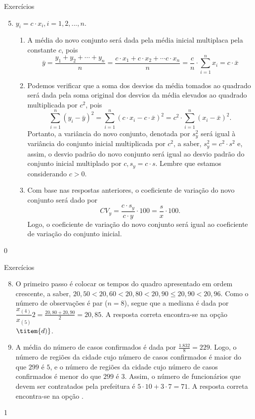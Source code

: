 \begin{answer}{Exercícios}
{\exerciselist
  \begin{enumerate}\setcounter{enumi}{4}
  \item $y_i=c\cdot x_i,i=1,2,...,n.$
  \begin{enumerate}
  \item A média do novo conjunto será dada pela média inicial multiplaca pela constante $c$, pois 
  \begin{equation*}
  \bar{y}=\frac{y_1+y_2+\cdots+y_n}{n}=\frac{c\cdot x_1+c\cdot x_2+\cdots c\cdot x_n}{n}=\frac{c}{n}\cdot\sum_{i=1}^n x_i=c\cdot\bar{x}
  \end{equation*}
  \item Podemos verificar que a soma dos desvios da média tomados ao quadrado será dada pela soma original dos desvios da média elevados ao quadrado multiplicada por $c^2$, pois
  \begin{equation*}
  \sum^n_{i=1}(y_i-\bar{y})^2=\sum_{i=1}^n(c\cdot x_i-c\cdot\bar{x})^2=c^2\cdot\sum^{n}_{i=1}(x_i-\bar{x})^2.
  \end{equation*}
  Portanto, a variância do novo conjunto, denotada por $s^2_y$ será igual à variância do conjunto inicial multiplicada por $c^2$, a saber, $s^2_y=c^2\cdot s^2$ e, assim, o desvio padrão do novo conjunto será igual ao desvio padrão do conjunto inicial multiplado por $c,s_y=c\cdot s$. Lembre que estamos considerando $c>0$.
  \item Com base nas respostas anteriores, o coeficiente de variação do novo conjunto será dado por
  \begin{equation*}
  CV_y=\frac{c\cdot s_y}{c\cdot y}\cdot 100=\frac{s}{x}\cdot100. 
  \end{equation*}
  Logo, o coeficiente de variação do novo conjunto será igual ao coeficiente de variação do conjunto inicial.
  \end{enumerate}
  \end{enumerate}
}{0}
\end{answer}
\clearmargin

\begin{answer}{Exercícios}
{\exerciselist
  \begin{enumerate}\setcounter{enumi}{7}
  \item O primeiro passo é colocar os tempos do quadro apresentado em ordem crescente, a saber, $20{,}50<20{,}60<20{,}80<20{,}90\leq20{,}90<20{,}96$. Como o número de observações é par ($n=8$), segue que a mediana é dada por $\dfrac{x_{(4)}}{x_{(5)}}{2}=\frac{20{,}80+20{,}90}{2}=20{,}85$. A resposta correta encontra-se na opção $\titem{d)}$.
  \item A média do número de casos confirmados é dada por $\frac{1.832}{8}=229$. Logo, o número de regiões da cidade cujo número de casos confirmados é maior do que $299$ é $5$, e o número de regiões da cidade cujo número de casos confirmados é menor do que $299$ é $3$. Assim, o número de funcionários que devem ser contratados pela prefeitura é $5\cdot10+3\cdot7=71$. A resposta correta encontra-se na opção .
  \end{enumerate}
}{1}
\end{answer}
\clearmargin

